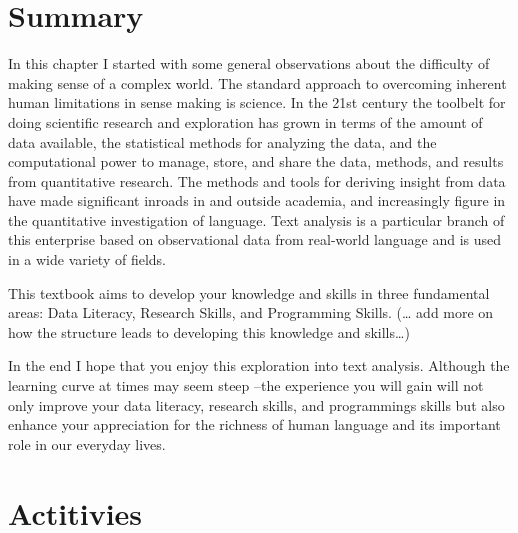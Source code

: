 \documentclass[
  letterpaper,
]{scrbook}
\begin{document}
\hypertarget{summary-1}{%
\section*{Summary}\label{summary-1}}


In this chapter I started with some general observations about the
difficulty of making sense of a complex world. The standard approach to
overcoming inherent human limitations in sense making is science. In the
21st century the toolbelt for doing scientific research and exploration
has grown in terms of the amount of data available, the statistical
methods for analyzing the data, and the computational power to manage,
store, and share the data, methods, and results from quantitative
research. The methods and tools for deriving insight from data have made
significant inroads in and outside academia, and increasingly figure in
the quantitative investigation of language. Text analysis is a
particular branch of this enterprise based on observational data from
real-world language and is used in a wide variety of fields.

This textbook aims to develop your knowledge and skills in three
fundamental areas: Data Literacy, Research Skills, and Programming
Skills. (\ldots{} add more on how the structure leads to developing this
knowledge and skills\ldots)

In the end I hope that you enjoy this exploration into text analysis.
Although the learning curve at times may seem steep --the experience you
will gain will not only improve your data literacy, research skills, and
programmings skills but also enhance your appreciation for the richness
of human language and its important role in our everyday lives.

\hypertarget{actitivies}{%
\section*{Actitivies}\label{actitivies}}

\end{document}
